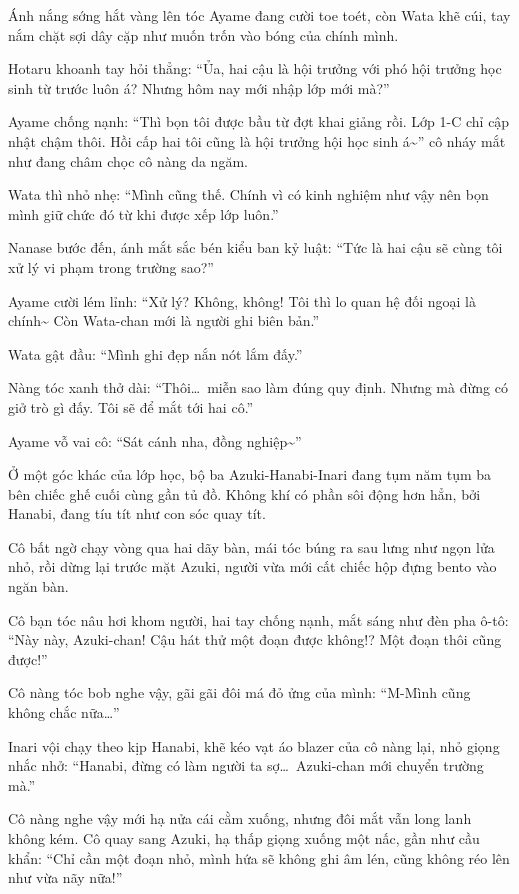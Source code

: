 \documentclass[../main.tex]{subfiles}
\begin{document}
Ánh nắng sớng hắt vàng lên tóc Ayame đang cười toe toét, còn Wata khẽ cúi, tay nắm chặt sợi dây cặp như muốn trốn vào bóng của chính mình.

Hotaru khoanh tay hỏi thẳng: ``Ủa, hai cậu là hội trưởng với phó hội trưởng học sinh từ trước luôn á? Nhưng hôm nay mới nhập lớp mới mà?''

Ayame chống nạnh: ``Thì bọn tôi được bầu từ đợt khai giảng rồi. Lớp 1-C chỉ cập nhật chậm thôi. Hồi cấp hai tôi cũng là hội trưởng hội học sinh á\~{}'' cô nháy mắt như đang châm chọc cô nàng da ngăm.

Wata thì nhỏ nhẹ: ``Mình cũng thế. Chính vì có kinh nghiệm như vậy nên bọn mình giữ chức đó từ khi được xếp lớp luôn.''

Nanase bước đến, ánh mắt sắc bén kiểu ban kỷ luật: ``Tức là hai cậu sẽ cùng tôi xử lý vi phạm trong trường sao?''

Ayame cười lém lỉnh: ``Xử lý? Không, không! Tôi thì lo quan hệ đối ngoại là chính\~{} Còn Wata-chan mới là người ghi biên bản.''

Wata gật đầu: ``Mình ghi đẹp nắn nót lắm đấy.''

Nàng tóc xanh thở dài: ``Thôi\dots\ miễn sao làm đúng quy định. Nhưng mà đừng có giở trò gì đấy. Tôi sẽ để mắt tới hai cô.''

Ayame vỗ vai cô: ``Sát cánh nha, đồng nghiệp\~{}''

Ở một góc khác của lớp học, bộ ba Azuki-Hanabi-Inari đang tụm năm tụm ba bên chiếc ghế cuối cùng gần tủ đồ. Không khí có phần sôi động hơn hẳn, bởi Hanabi, đang tíu tít như con sóc quay tít.

Cô bất ngờ chạy vòng qua hai dãy bàn, mái tóc búng ra sau lưng như ngọn lửa nhỏ, rồi dừng lại trước mặt Azuki, người vừa mới cất chiếc hộp đựng bento vào ngăn bàn.

Cô bạn tóc nâu hơi khom người, hai tay chống nạnh, mắt sáng như đèn pha ô-tô: ``Này này, Azuki-chan! Cậu hát thử một đoạn được không!? Một đoạn thôi cũng được!''

Cô nàng tóc bob nghe vậy, gãi gãi đôi má đỏ ửng của mình: ``M-Mình cũng không chắc nữa\dots''

Inari vội chạy theo kịp Hanabi, khẽ kéo vạt áo blazer của cô nàng lại, nhỏ giọng nhắc nhở: ``Hanabi, đừng có làm người ta sợ\dots\ Azuki-chan mới chuyển trường mà.''

Cô nàng nghe vậy mới hạ nửa cái cằm xuống, nhưng đôi mắt vẫn long lanh không kém. Cô quay sang Azuki, hạ thấp giọng xuống một nấc, gần như cầu khẩn: ``Chỉ cần một đoạn nhỏ, mình hứa sẽ không ghi âm lén, cũng không réo lên như vừa nãy nữa!''
\end{document}
